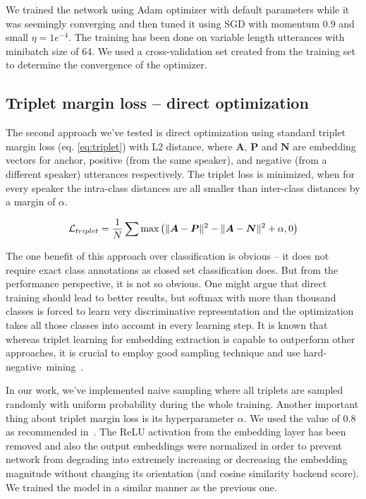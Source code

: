 \pagebreak
\noindent
We trained the network using Adam optimizer with default parameters while it was seemingly converging and then tuned it using SGD with momentum $ 0.9 $ and small $ \eta = 1e^{-4} $. The training has been done on variable length utterances with minibatch size of 64. We used a cross-validation set created from the training set to determine the convergence of the optimizer.

\subsection*{Triplet margin loss -- direct optimization}

The second approach we've tested is direct optimization using standard triplet margin loss (eq. \ref{eq:triplet}) with L2 distance, where $ \boldsymbol{A} $, $ \boldsymbol{P} $ and $ \boldsymbol{N} $ are embedding vectors for anchor, positive (from the same speaker), and negative (from a different speaker) utterances respectively. The triplet loss is minimized, when for every speaker the intra-class distances are all smaller than inter-class distances by a margin of $ \alpha $.

\begin{equation} \label{eq:triplet}
\mathcal{L}_{triplet} = \frac{1}{N} \sum \textnormal{max}
\left( 
\lVert\boldsymbol{A} - \boldsymbol{P}\rVert^2 - 
\lVert\boldsymbol{A} - \boldsymbol{N}\rVert^2 
+ \alpha, 0 \right)
\end{equation}

\noindent
The one benefit of this approach over classification is obvious -- it does not require exact class annotations as closed set classification does. But from the performance perspective, it is not so obvious. One might argue that direct training should lead to better results, but softmax with more than thousand classes is forced to learn very discriminative representation and the optimization takes all those classes into account in every learning step. It is known that whereas triplet learning for embedding extraction is capable to outperform other approaches, it is crucial to employ good sampling technique and use hard-negative~mining~\cite{YuanYZ16}.

\medskip
In our work, we've implemented naive sampling where all triplets are sampled randomly with uniform probability during the whole training. Another important thing about triplet margin loss is its hyperparameter $ \alpha $. We used the value of 0.8 as recommended in~\cite{x_vectors_triplet}. The ReLU activation from the embedding layer has been removed and also the output embeddings were normalized in order to prevent network from degrading into extremely increasing or decreasing the embedding magnitude without changing its orientation (and cosine similarity backend score). We trained the model in a similar manner as the previous one.

